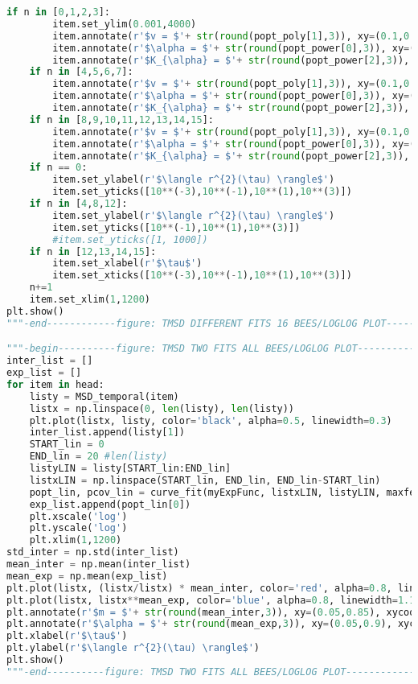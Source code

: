 \begin{lstlisting}[language=Python, basicstyle=\tiny, frame=single, keywordstyle=\color{teal}, commentstyle=\color{olive}, stringstyle=\color{red}]
    if n in [0,1,2,3]:
        item.set_ylim(0.001,4000)
        item.annotate(r'$v = $'+ str(round(popt_poly[1],3)), xy=(0.1,0.7), xycoords='axes fraction', fontsize=10)
        item.annotate(r'$\alpha = $'+ str(round(popt_power[0],3)), xy=(0.1,0.9), xycoords='axes fraction', fontsize=10)
        item.annotate(r'$K_{\alpha} = $'+ str(round(popt_power[2],3)), xy=(0.1,0.8), xycoords='axes fraction', fontsize=10)
    if n in [4,5,6,7]:
        item.annotate(r'$v = $'+ str(round(popt_poly[1],3)), xy=(0.1,0.7), xycoords='axes fraction', fontsize=10)
        item.annotate(r'$\alpha = $'+ str(round(popt_power[0],3)), xy=(0.1,0.9), xycoords='axes fraction', fontsize=10)
        item.annotate(r'$K_{\alpha} = $'+ str(round(popt_power[2],3)), xy=(0.1,0.8), xycoords='axes fraction', fontsize=10)
    if n in [8,9,10,11,12,13,14,15]:
        item.annotate(r'$v = $'+ str(round(popt_poly[1],3)), xy=(0.1,0.05), xycoords='axes fraction', fontsize=10)
        item.annotate(r'$\alpha = $'+ str(round(popt_power[0],3)), xy=(0.1,0.25), xycoords='axes fraction', fontsize=10)
        item.annotate(r'$K_{\alpha} = $'+ str(round(popt_power[2],3)), xy=(0.1,0.15), xycoords='axes fraction', fontsize=10)
    if n == 0:
        item.set_ylabel(r'$\langle r^{2}(\tau) \rangle$')
        item.set_yticks([10**(-3),10**(-1),10**(1),10**(3)])
    if n in [4,8,12]:
        item.set_ylabel(r'$\langle r^{2}(\tau) \rangle$')
        item.set_yticks([10**(-1),10**(1),10**(3)])
        #item.set_yticks([1, 1000])
    if n in [12,13,14,15]:
        item.set_xlabel(r'$\tau$')
        item.set_xticks([10**(-3),10**(-1),10**(1),10**(3)])
    n+=1
    item.set_xlim(1,1200)
plt.show()
"""-end------------figure: TMSD DIFFERENT FITS 16 BEES/LOGLOG PLOT-----------"""

"""-begin----------figure: TMSD TWO FITS ALL BEES/LOGLOG PLOT----------------"""
inter_list = []
exp_list = []
for item in head:
    listy = MSD_temporal(item)
    listx = np.linspace(0, len(listy), len(listy))
    plt.plot(listx, listy, color='black', alpha=0.5, linewidth=0.3)
    inter_list.append(listy[1])
    START_lin = 0
    END_lin = 20 #len(listy)
    listyLIN = listy[START_lin:END_lin]
    listxLIN = np.linspace(START_lin, END_lin, END_lin-START_lin)
    popt_lin, pcov_lin = curve_fit(myExpFunc, listxLIN, listyLIN, maxfev = 200000, p0=(2, 30))
    exp_list.append(popt_lin[0])
    plt.xscale('log')
    plt.yscale('log')
    plt.xlim(1,1200)
std_inter = np.std(inter_list)
mean_inter = np.mean(inter_list)
mean_exp = np.mean(exp_list)
plt.plot(listx, (listx/listx) * mean_inter, color='red', alpha=0.8, linewidth=1.3, linestyle='dotted')
plt.plot(listx, listx**mean_exp, color='blue', alpha=0.8, linewidth=1.1)
plt.annotate(r'$m = $'+ str(round(mean_inter,3)), xy=(0.05,0.85), xycoords='axes fraction', fontsize=10)
plt.annotate(r'$\alpha = $'+ str(round(mean_exp,3)), xy=(0.05,0.9), xycoords='axes fraction', fontsize=10)
plt.xlabel(r'$\tau$')
plt.ylabel(r'$\langle r^{2}(\tau) \rangle$')
plt.show()
"""-end----------figure: TMSD TWO FITS ALL BEES/LOGLOG PLOT----------------"""


\end{lstlisting}
